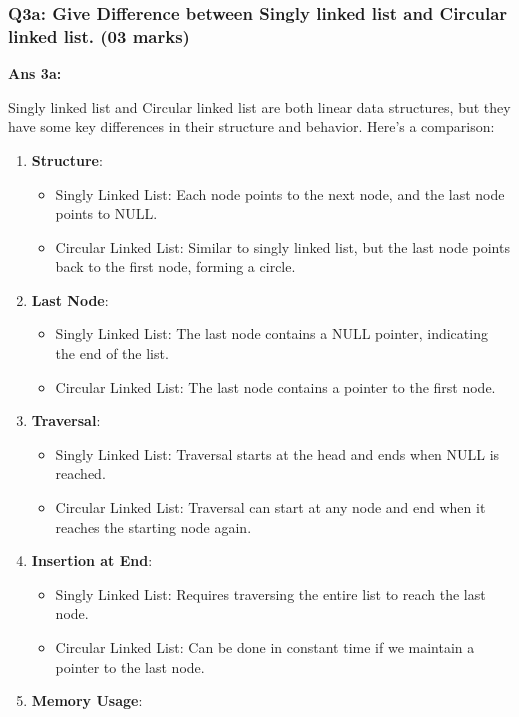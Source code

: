 \hypertarget{q3a-give-difference-between-singly-linked-list-and-circular-linked-list.-03-marks}{%
\subsubsection{Q3a: Give Difference between Singly linked list and
Circular linked list. (03
marks)}\label{q3a-give-difference-between-singly-linked-list-and-circular-linked-list.-03-marks}}

\textbf{Ans 3a:}

Singly linked list and Circular linked list are both linear data
structures, but they have some key differences in their structure and
behavior. Here's a comparison:

\begin{enumerate}
\def\labelenumi{\arabic{enumi}.}
\tightlist
\item
  \textbf{Structure}:

  \begin{itemize}
  \tightlist
  \item
    Singly Linked List: Each node points to the next node, and the last
    node points to NULL.
  \item
    Circular Linked List: Similar to singly linked list, but the last
    node points back to the first node, forming a circle.
  \end{itemize}
\item
  \textbf{Last Node}:

  \begin{itemize}
  \tightlist
  \item
    Singly Linked List: The last node contains a NULL pointer,
    indicating the end of the list.
  \item
    Circular Linked List: The last node contains a pointer to the first
    node.
  \end{itemize}
\item
  \textbf{Traversal}:

  \begin{itemize}
  \tightlist
  \item
    Singly Linked List: Traversal starts at the head and ends when NULL
    is reached.
  \item
    Circular Linked List: Traversal can start at any node and end when
    it reaches the starting node again.
  \end{itemize}
\item
  \textbf{Insertion at End}:

  \begin{itemize}
  \tightlist
  \item
    Singly Linked List: Requires traversing the entire list to reach the
    last node.
  \item
    Circular Linked List: Can be done in constant time if we maintain a
    pointer to the last node.
  \end{itemize}
\item
  \textbf{Memory Usage}:


\end{enumerate}
